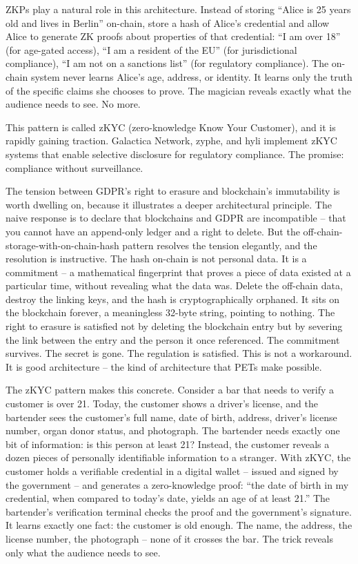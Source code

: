 \documentclass[
  11pt,
  openany]{report}
\begin{document}
ZKPs play a natural role in this architecture. Instead of storing ``Alice is 25
years old and lives in Berlin'' on-chain, store a hash of Alice's credential and
allow Alice to generate ZK proofs about properties of that credential: ``I am
over 18'' (for age-gated access), ``I am a resident of the EU'' (for
jurisdictional compliance), ``I am not on a sanctions list'' (for regulatory
compliance). The on-chain system never learns Alice's age, address, or identity.
It learns only the truth of the specific claims she chooses to prove. The
magician reveals exactly what the audience needs to see. No more.

This pattern is called zKYC (zero-knowledge Know Your Customer), and it is
rapidly gaining traction. Galactica Network, zyphe, and hyli implement zKYC
systems that enable selective disclosure for regulatory compliance. The promise:
compliance without surveillance.

The tension between GDPR's right to erasure and blockchain's immutability is
worth dwelling on, because it illustrates a deeper architectural principle. The
naive response is to declare that blockchains and GDPR are incompatible -- that
you cannot have an append-only ledger and a right to delete. But the
off-chain-storage-with-on-chain-hash pattern resolves the tension elegantly, and
the resolution is instructive. The hash on-chain is not personal data. It is a
commitment -- a mathematical fingerprint that proves a piece of data existed at
a particular time, without revealing what the data was. Delete the off-chain
data, destroy the linking keys, and the hash is cryptographically orphaned. It
sits on the blockchain forever, a meaningless 32-byte string, pointing to
nothing. The right to erasure is satisfied not by deleting the blockchain entry
but by severing the link between the entry and the person it once referenced.
The commitment survives. The secret is gone. The regulation is satisfied. This
is not a workaround. It is good architecture -- the kind of architecture that
PETs make possible.

The zKYC pattern makes this concrete. Consider a bar that needs to verify a
customer is over 21. Today, the customer shows a driver's license, and the
bartender sees the customer's full name, date of birth, address, driver's
license number, organ donor status, and photograph. The bartender needs exactly
one bit of information: is this person at least 21? Instead, the customer
reveals a dozen pieces of personally identifiable information to a stranger.
With zKYC, the customer holds a verifiable credential in a digital wallet --
issued and signed by the government -- and generates a zero-knowledge proof:
``the date of birth in my credential, when compared to today's date, yields an
age of at least 21.'' The bartender's verification terminal checks the proof and
the government's signature. It learns exactly one fact: the customer is old
enough. The name, the address, the license number, the photograph -- none of it
crosses the bar. The trick reveals only what the audience needs to see.
\end{document}
